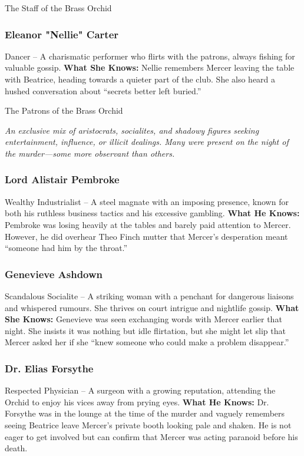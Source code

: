 \begin{WyrdFullNPC}[%
		name=The Staff of the Brass Orchid,%
		description=The people who keep the Orchid running,%
		float=!t%
	]{The Staff of the Brass Orchid}
	\subsubsection*{Eleanor "Nellie" Carter}
	Dancer – A charismatic performer who flirts with the patrons, always fishing for valuable gossip.
	\textbf{What She Knows:} Nellie remembers Mercer leaving the table with Beatrice, heading towards a quieter part of the club. She also heard a hushed conversation about “secrets better left buried.”
\end{WyrdFullNPC}

\begin{WyrdFullNPC}[%
		name=The Patrons of the Brass Orchid,%
		description=The elite clientele of the Orchid,%
		float=!t%
	]{The Patrons of the Brass Orchid}
	
    \emph{An exclusive mix of aristocrats, socialites, and shadowy figures seeking entertainment, influence, or illicit dealings. Many were present on the night of the murder—some more observant than others.}
        
	\subsubsection*{Lord Alistair Pembroke}
	Wealthy Industrialist – A steel magnate with an imposing presence, known for both his ruthless business tactics and his excessive gambling.  
	\textbf{What He Knows:} Pembroke was losing heavily at the tables and barely paid attention to Mercer. However, he did overhear Theo Finch mutter that Mercer’s desperation meant “someone had him by the throat.” 

	\subsubsection*{Genevieve Ashdown}
	Scandalous Socialite – A striking woman with a penchant for dangerous liaisons and whispered rumours. She thrives on court intrigue and nightlife gossip.
	\textbf{What She Knows:} Genevieve was seen exchanging words with Mercer earlier that night. She insists it was nothing but idle flirtation, but she might let slip that Mercer asked her if she “knew someone who could make a problem disappear.”

	\subsubsection*{Dr. Elias Forsythe}
	Respected Physician – A surgeon with a growing reputation, attending the Orchid to enjoy his vices away from prying eyes.
	\textbf{What He Knows:} Dr. Forsythe was in the lounge at the time of the murder and vaguely remembers seeing Beatrice leave Mercer’s private booth looking pale and shaken. He is not eager to get involved but can confirm that Mercer was acting paranoid before his death.
\end{WyrdFullNPC}

